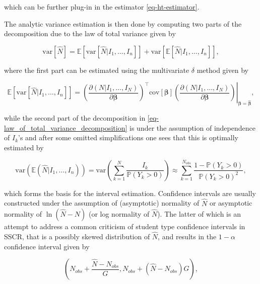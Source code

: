 \documentclass[
]{jss}
\newcommand{\1}{\mathcal{I}} \newcommand{\bZero}{\boldsymbol{0}}
\newcommand{\bbeta}{\boldsymbol{\beta}}
\begin{document}
which can be further plug-in in the estimator \eqref{eq-ht-estimator}.

The analytic variance estimation is then done by computing two parts of
the decomposition due to the law of total variance given by

\begin{equation}
  \text{var}[\hat{N}]=
  \mathbb{E}\left[\text{var}
  \left[\hat{N}|I_{1},\dots,I_{n}\right]\right]+
  \text{var}\left[\mathbb{E}[\hat{N}|I_{1},\dots,I_{n}]\right],
  \label{eq-law_of_total_variance_decomposition}
\end{equation}

where the first part can be estimated using the multivariate \(\delta\)
method given by

\begin{equation}
  \mathbb{E}\left[\text{var}
  \left[\hat{N}|I_{1},\dots,I_{n}\right]\right]=
  \left.\left(\frac{\partial(N|I_1,\dots,I_N)}{\partial\bbeta}\right)^\top
  \text{cov}\left[\bbeta\right]
  \left(\frac{\partial(N|I_1,\dots,I_N)}{\partial\bbeta}\right)
  \right|_{\bbeta=\hat{\bbeta}},
\end{equation}

while the second part of the decomposition in
\eqref{eq-law_of_total_variance_decomposition} is under the assumption
of independence of \(I_{k}\)'s and after some omitted simplifications
one sees that this is optimally estimated by

\begin{equation}
  \text{var}\left(\mathbb{E}(\hat{N}|I_{1},\dots,I_{n})\right)=
  \text{var}\left(\sum_{k=1}^{N}\frac{I_{k}}{\mathbb{P}(Y_{k}>0)}\right)
  \approx\sum_{k=1}^{N_{obs}}\frac{1-\mathbb{P}(Y_{k}>0)}{\mathbb{P}(Y_{k}>0)^{2}},
\end{equation}

which forms the basis for the interval estimation. Confidence intervals
are usually constructed under the assumption of (asymptotic) normality
of \(\hat{N}\) or asymptotic normality of \(\ln(\hat{N}-N)\) (or log
normality of \(\hat{N}\)). The latter of which is an attempt to address
a common criticism of student type confidence intervals in SSCR, that is
a possibly skewed distribution of \(\hat{N}\), and results in the
\(1-\alpha\) confidence interval given by

\begin{equation*}
  \left(N_{obs}+\frac{\hat{N}-N_{obs}}{G},N_{obs}+\left(\hat{N}-N_{obs}\right)G\right),
\end{equation*}
\end{document}
